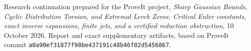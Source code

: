 Research continuation prepared for the ProveIt project,
\emph{Sharp Gaussian Bounds, Cyclic Distribution Torsion, and Extremal
Lerch Zeros: Critical Euler constants, exact inverse expansions,
finite jets, and a certified reduction obstruction}, 10 October 2026.
Report and exact supplementary artifacts, based on ProveIt commit
\texttt{a0a90ef31877f98be437191c48b46f02d5456867}.
